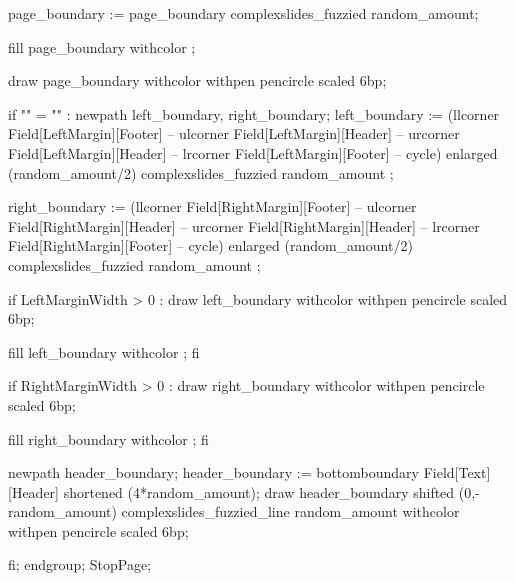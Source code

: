   page_boundary := page_boundary complexslides_fuzzied random_amount;

  fill page_boundary withcolor ;

  draw page_boundary withcolor  
       withpen pencircle scaled 6bp;

  if "\currentmakeup" = "" :
     newpath left_boundary, right_boundary;
      left_boundary := (llcorner Field[LeftMargin][Footer]
                     -- ulcorner Field[LeftMargin][Header]
                     -- urcorner Field[LeftMargin][Header]
                     -- lrcorner Field[LeftMargin][Footer]
                     -- cycle)
                     enlarged (random_amount/2) 
                     complexslides_fuzzied random_amount ;

      right_boundary := (llcorner Field[RightMargin][Footer]
                      -- ulcorner Field[RightMargin][Header]
                      -- urcorner Field[RightMargin][Header]
                      -- lrcorner Field[RightMargin][Footer]
                      -- cycle)
                      enlarged (random_amount/2) 
                     complexslides_fuzzied random_amount ;
      
     if LeftMarginWidth > 0 :
        draw left_boundary 
           withcolor 
           withpen pencircle scaled 6bp;

       fill left_boundary withcolor ;
     fi

     if RightMarginWidth > 0 :
        draw right_boundary 
           withcolor 
           withpen pencircle scaled 6bp;

       fill right_boundary withcolor ;
     fi

     newpath header_boundary;
     header_boundary := bottomboundary Field[Text][Header] shortened (4*random_amount);
     draw header_boundary shifted (0,-random_amount)
          complexslides_fuzzied_line random_amount
           withcolor 
           withpen pencircle scaled 6bp;

  fi;
  endgroup;
  StopPage;
\stopuseMPgraphic


\setupbackgrounds[\v!page][\c!background={complexslides:pagebackground}]


\protect

\stopmodule
